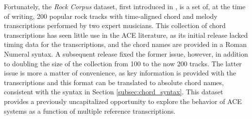 





Fortunately, the \emph{Rock Corpus} dataset, first introduced in \cite{deClerqc2010}, is a set of, at the time of writing, 200 popular rock tracks with time-aligned chord and melody transcriptions performed by two expert musicians.
This collection of chord transcriptions has seen little use in the ACE literature, as its initial release lacked timing data for the transcriptions, and the chord names are provided in a Roman Numeral syntax.
A subsequent release fixed the former issue, however, in addition to doubling the size of the collection from 100 to the now 200 tracks.
The latter issue is more a matter of convenience, as key information is provided with the transcriptions and this format can be translated to absolute chord names, consistent with the syntax in Section \ref{subsec:chord_syntax}.
This dataset provides a previously uncapitalized opportunity to explore the behavior of ACE systems as a function of multiple reference transcriptions.




